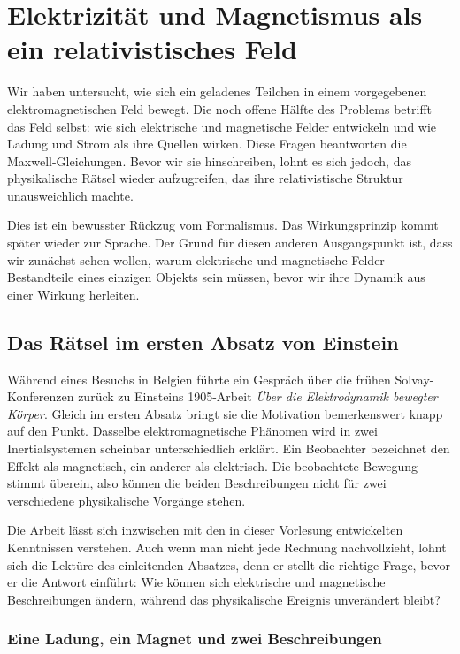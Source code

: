 \chapter{Elektrizität und Magnetismus als ein relativistisches Feld}

Wir haben untersucht, wie sich ein geladenes Teilchen in einem vorgegebenen elektromagnetischen Feld bewegt. Die noch offene Hälfte des Problems betrifft das Feld selbst: wie sich elektrische und magnetische Felder entwickeln und wie Ladung und Strom als ihre Quellen wirken. Diese Fragen beantworten die Maxwell-Gleichungen. Bevor wir sie hinschreiben, lohnt es sich jedoch, das physikalische Rätsel wieder aufzugreifen, das ihre relativistische Struktur unausweichlich machte.

Dies ist ein bewusster Rückzug vom Formalismus. Das Wirkungsprinzip kommt später wieder zur Sprache. Der Grund für diesen anderen Ausgangspunkt ist, dass wir zunächst sehen wollen, warum elektrische und magnetische Felder Bestandteile eines einzigen Objekts sein müssen, bevor wir ihre Dynamik aus einer Wirkung herleiten.

\section{Das Rätsel im ersten Absatz von Einstein}

Während eines Besuchs in Belgien führte ein Gespräch über die frühen Solvay-Konferenzen zurück zu Einsteins 1905-Arbeit \emph{Über die Elektrodynamik bewegter Körper}. Gleich im ersten Absatz bringt sie die Motivation bemerkenswert knapp auf den Punkt. Dasselbe elektromagnetische Phänomen wird in zwei Inertialsystemen scheinbar unterschiedlich erklärt. Ein Beobachter bezeichnet den Effekt als magnetisch, ein anderer als elektrisch. Die beobachtete Bewegung stimmt überein, also können die beiden Beschreibungen nicht für zwei verschiedene physikalische Vorgänge stehen.

Die Arbeit lässt sich inzwischen mit den in dieser Vorlesung entwickelten Kenntnissen verstehen. Auch wenn man nicht jede Rechnung nachvollzieht, lohnt sich die Lektüre des einleitenden Absatzes, denn er stellt die richtige Frage, bevor er die Antwort einführt: Wie können sich elektrische und magnetische Beschreibungen ändern, während das physikalische Ereignis unverändert bleibt?

\subsection{Eine Ladung, ein Magnet und zwei Beschreibungen}


